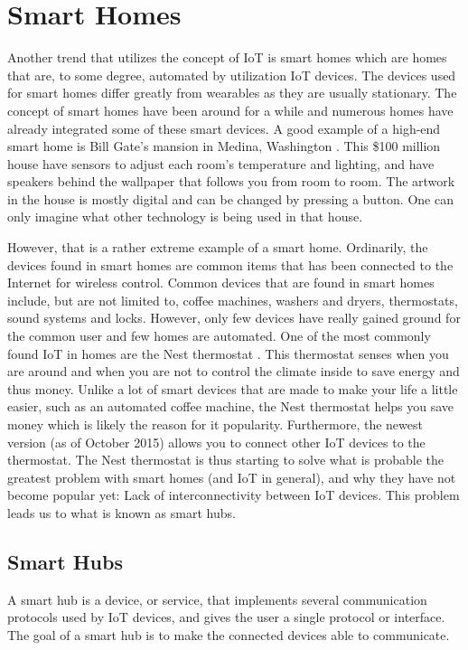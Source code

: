 \section{Smart Homes}
Another trend that utilizes the concept of IoT is smart homes which are homes that are, 
to some degree, automated by utilization IoT devices. 
The devices used for smart homes differ greatly from wearables as they are usually stationary. 
The concept of smart homes have been around for a while and numerous homes have already integrated some of these smart devices. 
A good example of a high-end smart home is Bill Gate's mansion in Medina, Washington \cite{billgatehouse}.
This \$100 million house have sensors to adjust each room's temperature and lighting, 
and have speakers behind the wallpaper that follows you from room to room. 
The artwork in the house is mostly digital and can be changed by pressing a button. 
One can only imagine what other technology is being used in that house. 

However, that is a rather extreme example of a smart home. 
Ordinarily, the devices found in smart homes are common items that has been connected to the Internet for wireless control.
Common devices that are found in smart homes include, but are not limited to, 
coffee machines, washers and dryers, thermostats, sound systems and locks. 
However, only few devices have really gained ground for the common user and few homes are automated.
One of the most commonly found IoT in homes are the Nest thermostat \cite{NEST}. 
This thermostat senses when you are around and when you are not to control the climate inside to save energy and thus money.
Unlike a lot of smart devices that are made to make your life a little easier, such as an automated coffee machine, 
the Nest thermostat helps you save money which is likely the reason for it popularity. 
Furthermore, the newest version (as of October 2015) allows you to connect other IoT devices to the thermostat. 
The Nest thermostat is thus starting to solve what is probable the greatest problem with smart homes (and IoT in general), 
and why they have not become popular yet: Lack of interconnectivity between IoT devices. 
This problem leads us to what is known as smart hubs. 

\subsection{Smart Hubs}
A smart hub is a device, or service, that implements several communication protocols used by IoT devices, 
and gives the user a single protocol or interface. 
The goal of a smart hub is to make the connected devices able to communicate. 

